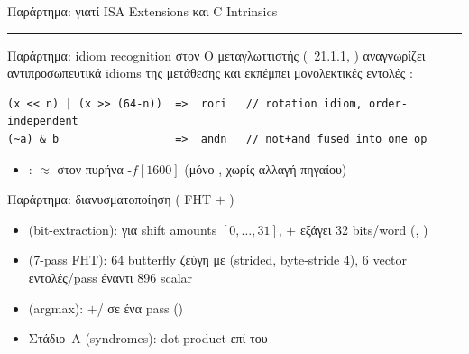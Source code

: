 \begin{frame}{Παράρτημα: γιατί ISA Extensions και C Intrinsics}
  \pdfpcnote{}
  \pdfpcnote{}
  \centering
  \resizebox{0.82\textwidth}{!}{}
  \par\medskip
  \textcolor{gray!45}{\rule{0.55\linewidth}{0.4pt}}
  \par\medskip
  \resizebox{0.82\textwidth}{!}{}
\end{frame}

\begin{frame}[fragile]{Παράρτημα:  idiom recognition στον }
  Ο μεταγλωττιστής (~21.1.1, ) αναγνωρίζει αντιπροσωπευτικά
   idioms της μετάθεσης και εκπέμπει μονολεκτικές εντολές \Zbb:
  \begin{lstlisting}
(x << n) | (x >> (64-n))  =>  rori   // rotation idiom, order-independent
(~a) & b                  =>  andn   // not+and fused into one op
  \end{lstlisting}
  \begin{itemize}\small
    \item {}: ${\approx}$ στον πυρήνα -$f[1600]$ (μόνο , χωρίς αλλαγή πηγαίου)
  \end{itemize}
\end{frame}

\begin{frame}{Παράρτημα: διανυσματοποίηση  ( FHT $+$ )}
  \begin{itemize}\small
    \item {} (bit-extraction):  για shift amounts $[0,\ldots,31]$, $+$ εξάγει \num{32} bits/word (, )
    \item {} (7-pass FHT): \num{64} butterfly ζεύγη με  (strided, byte-stride \num{4}), \num{6} vector εντολές/pass έναντι \num{896} scalar 
    \item {} (argmax): $+$/ σε ένα pass ()
    \item {} Στάδιο~A (syndromes): dot-product επί του 
  \end{itemize}
\end{frame}

